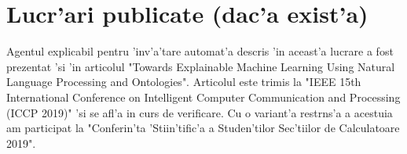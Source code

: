 \chapter{Lucr'ari publicate (dac'a exist'a)}

Agentul explicabil pentru 'inv'a'tare automat'a descris 'in aceast'a lucrare a fost prezentat 'si 'in articolul "Towards Explainable Machine Learning Using  Natural Language Processing and Ontologies". Articolul este trimis la "IEEE 15th International Conference on
Intelligent Computer Communication and Processing (ICCP 2019)" 'si se afl'a in curs de verificare. Cu o variant'a restr\ia ns'a a acestuia am participat la "Conferin'ta 'Stiin'tific'a a Studen'tilor Sec'tiilor de Calculatoare 2019".

